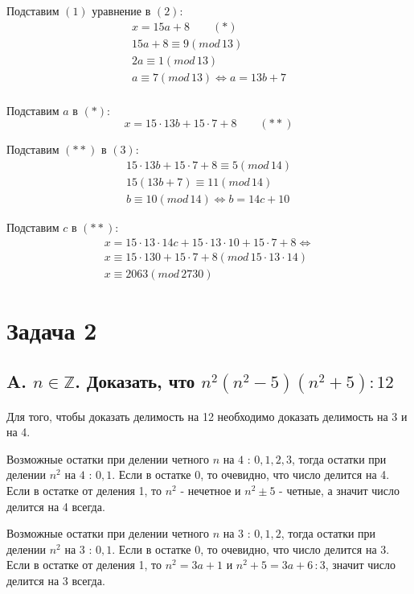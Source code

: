 \documentclass[a4paper,12pt]{article}
\begin{document}
Подставим $(1)$ уравнение в $(2)$: 
\begin{gather*}
    x = 15a + 8 \qquad (*) \\
    15a + 8 \equiv 9(mod\, 13) \\
    2a \equiv 1(mod\, 13) \\
    a \equiv 7(mod\, 13) \Leftrightarrow a = 13b + 7 \\
\end{gather*}

Подставим $a$ в $(*)$:
$$
x = 15\cdot 13 b + 15 \cdot 7 + 8 \qquad (**) 
$$

Подставим $(**)$ в $(3)$:
\begin{gather*}
    15\cdot 13 b + 15 \cdot 7 + 8 \equiv 5 (mod\, 14) \\
    15(13b +7) \equiv 11 (mod\, 14)\\
    b \equiv 10 (mod\, 14) \Leftrightarrow b = 14c + 10
\end{gather*}

Подставим $c$ в $(**)$:
\begin{gather*}
    x = 15\cdot 13 \cdot 14 c + 15\cdot 13 \cdot 10 + 15\cdot 7 + 8 \Leftrightarrow \\
    x \equiv 15 \cdot 130 + 15\cdot 7 + 8 (mod\, 15\cdot 13\cdot 14)\\
    x \equiv 2063 (mod\, 2730)
\end{gather*}


\section*{Задача 2}
\subsection*{A. $n \in \mathbb{Z}$. Доказать, что $n^2(n^2-5)(n^2+5) : 12$}

Для того, чтобы доказать делимость на 12 необходимо доказать делимость на 3 и на 4.

Возможные остатки при делении четного $n$ на $4$ : $0,1,2,3$, тогда остатки при делении $n^2$ на $4$ : $0,1$.
Если в остатке 0, то очевидно, что число делится на 4.
Если в остатке от деления 1, то $n^2$ - нечетное и $n^2 \pm 5$ - четные, а значит число делится на 4 всегда.


Возможные остатки при делении четного $n$ на $3$ : $0,1,2$, тогда остатки при делении $n^2$ на $3$ : $0,1$.
Если в остатке 0, то очевидно, что число делится на 3.
Если в остатке от деления 1, то $n^2=3a+1$ и $n^2 + 5 = 3a+6 \, :3$, значит число делится на 3 всегда.
\end{document}
